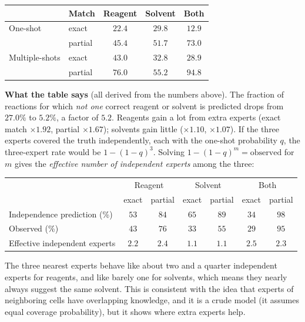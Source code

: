 \documentclass[11pt]{article}
\begin{document}
\begin{center}
\small
\begin{tabular}{@{}llccc@{}}
\toprule
 & Match & Reagent & Solvent & Both\\
\midrule
One-shot & exact & $22.4$ & $29.8$ & $12.9$\\
 & partial & $45.4$ & $51.7$ & $73.0$\\
Multiple-shots & exact & $43.0$ & $32.8$ & $28.9$\\
 & partial & $76.0$ & $55.2$ & $94.8$\\
\bottomrule
\end{tabular}
\end{center}

\textbf{What the table says} (all derived from the numbers above). The fraction of reactions for which \emph{not one} correct reagent or solvent is predicted drops from $27.0\%$ to $5.2\%$, a factor of $5.2$. Reagents gain a lot from extra experts (exact match $\times1.92$, partial $\times1.67$); solvents gain little ($\times1.10$, $\times1.07$). If the three experts covered the truth independently, each with the one-shot probability $q$, the three-expert rate would be $1-(1-q)^3$. Solving $1-(1-q)^m=\text{observed}$ for $m$ gives the \emph{effective number of independent experts} among the three:

\begin{center}
\small
\begin{tabular}{@{}lcccccc@{}}
\toprule
 & \multicolumn{2}{c}{Reagent} & \multicolumn{2}{c}{Solvent} & \multicolumn{2}{c}{Both}\\
 & exact & partial & exact & partial & exact & partial\\
\midrule
Independence prediction (\%) & $53$ & $84$ & $65$ & $89$ & $34$ & $98$\\
Observed (\%) & $43$ & $76$ & $33$ & $55$ & $29$ & $95$\\
Effective independent experts & $2.2$ & $2.4$ & $1.1$ & $1.1$ & $2.5$ & $2.3$\\
\bottomrule
\end{tabular}
\end{center}

The three nearest experts behave like about two and a quarter independent experts for reagents, and like barely one for solvents, which means they nearly always suggest the same solvent. This is consistent with the idea that experts of neighboring cells have overlapping knowledge, and it is a crude model (it assumes equal coverage probability), but it shows where extra experts help.
\end{document}
